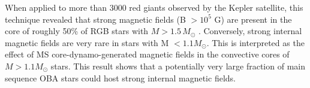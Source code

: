 When applied to more than 3000 red giants observed by the Kepler satellite, this technique revealed that strong magnetic fields (B $> 10^5$ G) are present in the core of roughly 50\% of RGB stars with $M \! > \! 1.5 \, M_\odot$ \citep{Stello_2016,Stello_2016a}. Conversely, strong internal magnetic fields are very rare in stars with M $< 1.1M_\odot$. This is interpreted as the effect of MS core-dynamo-generated magnetic fields in the convective cores of $M \! > 1.1M_\odot$ stars. This result shows that a potentially very large fraction of main sequence OBA stars could host strong internal magnetic fields.




